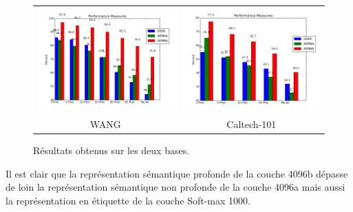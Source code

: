 \begin{figure}[H]
\centering
\begin{tabular}{cc}
\centering

\includegraphics[width=9cm]{Figures/results/res-wang1.png}
&
\includegraphics[width=9cm]{Figures/results/res-caltech1.png}\\
WANG & Caltech-101\\
\end{tabular}
\caption[comp7]{Résultats obtenus sur les deux bases.}
\end{figure}

	Il est clair que la représentation sémantique profonde de la couche 4096b dépasse de loin la représentation sémantique non profonde de la couche 4096a mais aussi la représentation en étiquette de la couche Soft-max 1000.	



